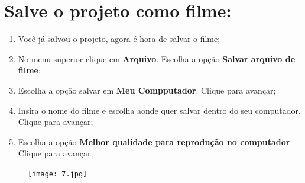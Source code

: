 \documentclass{article}
\begin{document}
{\newpage

\section{Salve o projeto como filme:}
\begin{enumerate}
\item Você já salvou o projeto, agora é hora de salvar o filme;
\item No menu superior clique em \textbf{Arquivo}. Escolha a opção \textbf{Salvar arquivo de filme};
\item Escolha a opção salvar em \textbf{Meu Compputador}. Clique para
avançar;
\item Insira o nome do filme e escolha aonde quer salvar dentro do seu computador. Clique para avançar;
\item Escolha a opção \textbf{Melhor qualidade para reprodução no computador}. Clique para avançar;
\end{enumerate}

\begin{figure}[h!]
\centering
\texttt{[image: 7.jpg]}
\end{figure}

}
\end{document}
